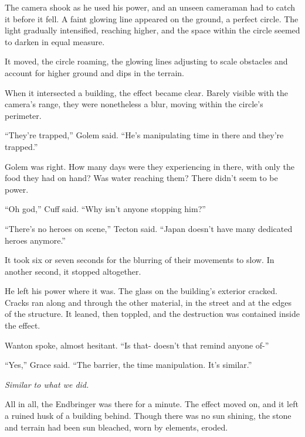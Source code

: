 The camera shook as he used his power, and an unseen cameraman had to catch it before it fell.  A faint glowing line appeared on the ground, a perfect circle.   The light gradually intensified, reaching higher, and the space within the circle seemed to darken in equal measure.



It moved, the circle roaming, the glowing lines adjusting to scale obstacles and account for higher ground and dips in the terrain.



When it intersected a building, the effect became clear.  Barely visible with the camera's range, they were nonetheless a blur, moving within the circle's perimeter.



``They're trapped,'' Golem said.  ``He's manipulating time in there and they're trapped.''



Golem was right.  How many days were they experiencing in there, with only the food they had on hand?  Was water reaching them?  There didn't seem to be power.



``Oh god,'' Cuff said.  ``Why isn't anyone stopping him?''



``There's no heroes on scene,'' Tecton said.  ``Japan doesn't have many dedicated heroes anymore.''



It took six or seven seconds for the blurring of their movements to slow.  In another second, it stopped altogether.



He left his power where it was.  The glass on the building's exterior cracked.  Cracks ran along and through the other material, in the street and at the edges of the structure.  It leaned, then toppled, and the destruction was contained inside the effect.



Wanton spoke, almost hesitant.  ``Is that- doesn't that remind anyone of-''



``Yes,'' Grace said.  ``The barrier, the time manipulation.  It's similar.''



\emph{Similar to what we did.}



All in all, the Endbringer was there for a minute.  The effect moved on, and it left a ruined husk of a building behind.  Though there was no sun shining, the stone and terrain had been sun bleached, worn by elements, eroded.



